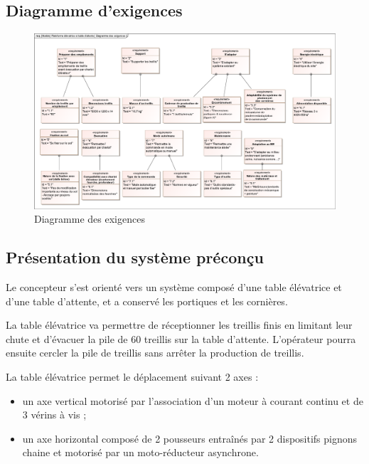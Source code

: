 \subsection{Diagramme d'exigences}

\begin{figure}[!h]
\centering
\includegraphics[width=\linewidth]{img/Diagramme_des_exigences}
\caption{Diagramme des exigences}
\label{Diagramme_des_exigences}
\end{figure}

\subsection{Présentation du système préconçu}

Le concepteur s'est orienté vers un système composé d'une table élévatrice et d'une table d'attente, et a conservé les portiques et les cornières.

La table élévatrice va permettre de réceptionner les treillis finis en limitant leur chute et d'évacuer la pile de 60 treillis sur la table d'attente. L'opérateur pourra ensuite cercler la pile de treillis sans arrêter la production de treillis.

La table élévatrice permet le déplacement suivant 2 axes :
\begin{itemize}
 \item un axe vertical motorisé par l'association d'un moteur à courant continu et de 3 vérins à vis ;
 \item un axe horizontal composé de 2 pousseurs entraînés par 2 dispositifs pignons chaine et motorisé par un moto-réducteur asynchrone.
\end{itemize}

